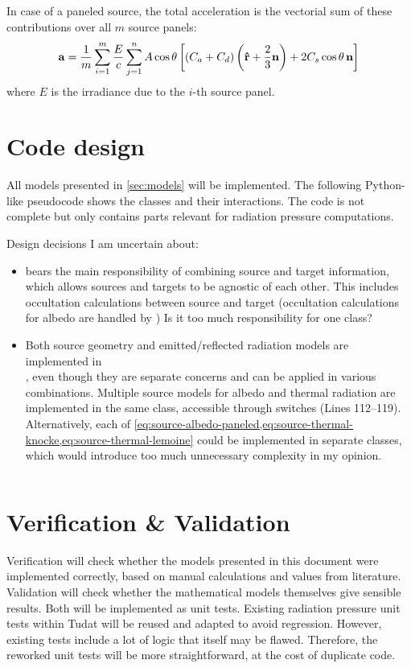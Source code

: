 \documentclass[parskip=full,DIV=15]{scrartcl}
\begin{document}
In case of a paneled source, the total acceleration is the vectorial sum of these contributions over all $m$ source panels:
\begin{align}
   \vb a = \frac{1}{m} \sum_{i=1}^m \frac{E}{c} \sum_{j=1}^n A \cos\theta \left[(C_a + C_d)\left(\vu r + \frac{2}{3} \vb n\right) + 2 C_s \cos\theta \, \vb n \right]
\end{align}
where $E$ is the irradiance due to the $i$-th source panel.



\section{Code design}
All models presented in \cref{sec:models} will be implemented. The following Python-like pseudocode shows the classes and their interactions. The code is not complete but only contains parts relevant for radiation pressure computations.

Design decisions I am uncertain about:
\begin{itemize}
   \item {} bears the main responsibility of combining source and target information, which allows sources and targets to be agnostic of each other. This includes occultation calculations between source and target (occultation calculations for albedo are handled by ) Is it too much responsibility for one class?
   \item Both source geometry and emitted/reflected radiation models are implemented in \\ , even though they are separate concerns and can be applied in various combinations. Multiple source models for albedo and thermal radiation are implemented in the same class, accessible through switches (Lines 112--119). Alternatively, each of \cref{eq:source-albedo-paneled,eq:source-thermal-knocke,eq:source-thermal-lemoine} could be implemented in separate classes, which would introduce too much unnecessary complexity in my opinion.
\end{itemize}

\inputminted{python}{code_design.py}







\section{Verification \& Validation}
Verification will check whether the models presented in this document were implemented correctly, based on manual calculations and values from literature. Validation will check whether the mathematical models themselves give sensible results. Both will be implemented as unit tests. Existing radiation pressure unit tests within Tudat will be reused and adapted to avoid regression. However, existing tests include a lot of logic that itself may be flawed. Therefore, the reworked unit tests will be more straightforward, at the cost of duplicate code.
\end{document}
